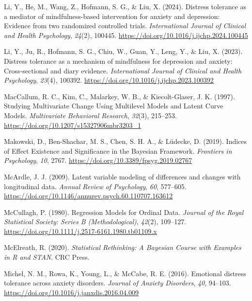 \documentclass[
  man,floatsintext]{apa7}
\newlength{\cslhangindent}
\newlength{\cslentryspacingunit} %
\newenvironment{CSLReferences}[2] %
 {%
  \setlength{\parindent}{0pt}
  \ifodd #1
  \let\oldpar\par
  \def\par{\hangindent=\cslhangindent\oldpar}
  \fi
  \setlength{\parskip}{#2\cslentryspacingunit}
 }%
 {}
\begin{document}
\begin{CSLReferences}{1}{0}
\leavevmode{}%
Li, Y., He, M., Wang, Z., Hofmann, S. G., \& Liu, X. (2024). Distress tolerance as a mediator of mindfulness-based intervention for anxiety and depression: Evidence from two randomized controlled trials. \emph{International Journal of Clinical and Health Psychology}, \emph{24}(2), 100445. \url{https://doi.org/10.1016/j.ijchp.2024.100445}

\leavevmode{}%
Li, Y., Ju, R., Hofmann, S. G., Chiu, W., Guan, Y., Leng, Y., \& Liu, X. (2023). Distress tolerance as a mechanism of mindfulness for depression and anxiety: Cross-sectional and diary evidence. \emph{International Journal of Clinical and Health Psychology}, \emph{23}(4), 100392. \url{https://doi.org/10.1016/j.ijchp.2023.100392}

\leavevmode{}%
MacCallum, R. C., Kim, C., Malarkey, W. B., \& Kiecolt-Glaser, J. K. (1997). Studying Multivariate Change Using Multilevel Models and Latent Curve Models. \emph{Multivariate Behavioral Research}, \emph{32}(3), 215--253. \url{https://doi.org/10.1207/s15327906mbr3203_1}

\leavevmode{}%
Makowski, D., Ben-Shachar, M. S., Chen, S. H. A., \& Lüdecke, D. (2019). Indices of Effect Existence and Significance in the Bayesian Framework. \emph{Frontiers in Psychology}, \emph{10}, 2767. \url{https://doi.org/10.3389/fpsyg.2019.02767}

\leavevmode{}%
McArdle, J. J. (2009). Latent variable modeling of differences and changes with longitudinal data. \emph{Annual Review of Psychology}, \emph{60}, 577--605. \url{https://doi.org/10.1146/annurev.psych.60.110707.163612}

\leavevmode{}%
McCullagh, P. (1980). Regression Models for Ordinal Data. \emph{Journal of the Royal Statistical Society: Series B (Methodological)}, \emph{42}(2), 109--127. \url{https://doi.org/10.1111/j.2517-6161.1980.tb01109.x}

\leavevmode{}%
McElreath, R. (2020). \emph{Statistical Rethinking: A Bayesian Course with Examples in R and STAN}. CRC Press.

\leavevmode{}%
Michel, N. M., Rowa, K., Young, L., \& McCabe, R. E. (2016). Emotional distress tolerance across anxiety disorders. \emph{Journal of Anxiety Disorders}, \emph{40}, 94--103. \url{https://doi.org/10.1016/j.janxdis.2016.04.009}


\end{CSLReferences}
\end{document}
